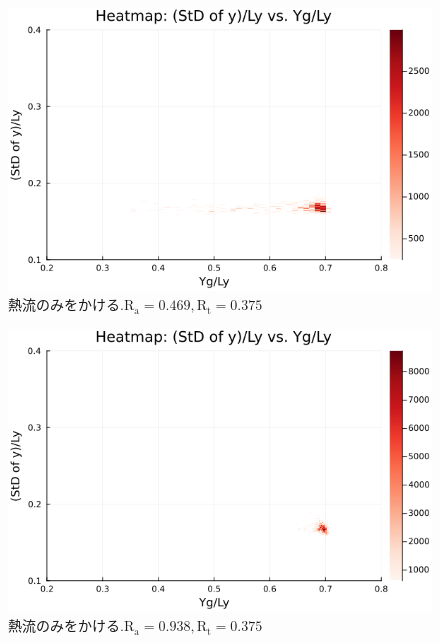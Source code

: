 \begin{figure}[H]
  \centering
  \includegraphics[scale=0.6]{image/g0_heat/2024-01-15T14:07:35.651_mapg0_chiinf_Ay50_rho0.4_T0.43_dT0.04_Rd0.0_Rt0.375_Ra0.4693845_g0_run4.0e7.png}
  \caption{$熱流のみをかける. \text{R}_\text{a}=0.469,\text{R}_\text{t}=0.375$}
  \label{}
\end{figure}

\begin{figure}[H]
  \centering
  \includegraphics[scale=0.6]{image/g0_heat/2024-01-15T14:07:35.728_mapg0_chiinf_Ay50_rho0.4_T0.43_dT0.04_Rd0.0_Rt0.375_Ra0.938769_g0_run4.0e7.png}
  \caption{$熱流のみをかける. \text{R}_\text{a}=0.938,\text{R}_\text{t}=0.375$}
  \label{}
\end{figure}

